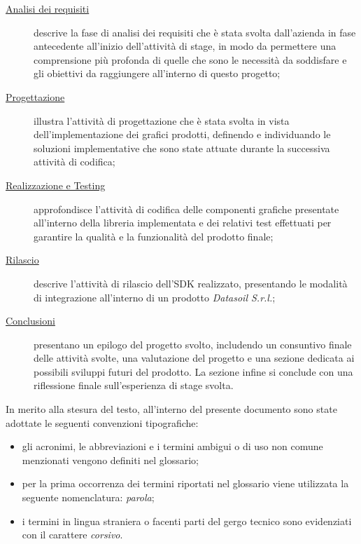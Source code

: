 \begin{description}
      \item[{\hyperref[chap:analisi-requisiti]{Analisi dei requisiti}}] descrive la fase di analisi dei requisiti che è stata
            svolta dall'azienda in fase antecedente all'inizio dell'attività di stage, in modo da permettere una comprensione più profonda
            di quelle che sono le necessità da soddisfare e gli obiettivi da raggiungere all'interno di questo progetto;

      \item[{\hyperref[chap:progettazione]{Progettazione}}] illustra l'attività di progettazione che è stata svolta in vista dell'implementazione
            dei grafici prodotti, definendo e individuando le soluzioni implementative che sono state attuate durante la successiva attività di codifica;

      \item[{\hyperref[chap:realizzazione-testing]{Realizzazione e Testing}}] approfondisce l'attività di codifica delle componenti grafiche presentate
            all'interno della libreria implementata e dei relativi test effettuati per garantire la qualità e la funzionalità del prodotto finale;

      \item[{\hyperref[chap:rilascio]{Rilascio}}] descrive l'attività di rilascio dell'SDK realizzato, presentando le modalità di integrazione
            all'interno di un prodotto \textit{Datasoil S.r.l.};

      \item[{\hyperref[chap:conclusioni]{Conclusioni}}] presentano un epilogo del progetto svolto, includendo un consuntivo finale delle attività svolte,
            una valutazione del progetto e una sezione dedicata ai possibili sviluppi futuri del prodotto.
            La sezione infine si conclude con una riflessione finale sull'esperienza di stage svolta.
\end{description}
In merito alla stesura del testo, all'interno del presente documento sono state adottate le seguenti convenzioni tipografiche:
\begin{itemize}
      \item gli acronimi, le abbreviazioni e i termini ambigui o di uso non comune menzionati vengono definiti nel glossario;
      \item per la prima occorrenza dei termini riportati nel glossario viene utilizzata la seguente nomenclatura: \textit{parola}\glox\gloxspacing;
      \item i termini in lingua straniera o facenti parti del gergo tecnico sono evidenziati con il carattere \textit{corsivo}.
\end{itemize}
